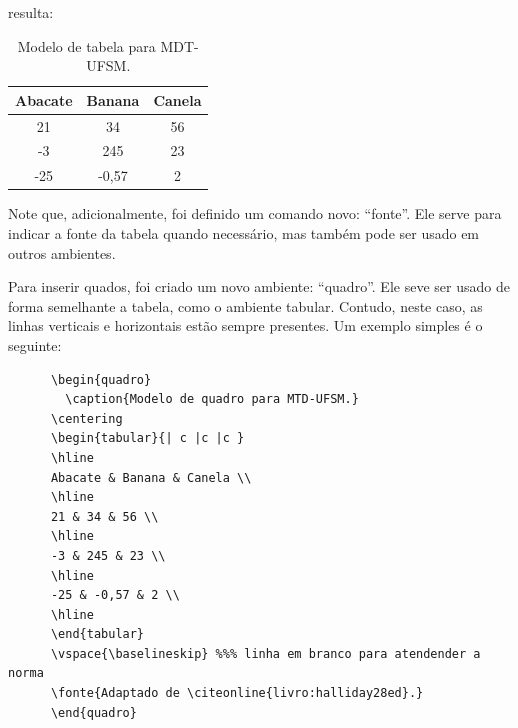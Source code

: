 \documentclass[oneside,openright,12pt]{ufsm_2015} %
\begin{document}
         \noindent resulta:
         
         \begin{table}[ht]
         \centering
         \caption{Modelo de tabela para MDT-UFSM.}
         \begin{tabular}{ c c c }
         \hline
         Abacate & Banana & Canela \\
         \hline
         21 & 34 & 56 \\
         -3 & 245 & 23 \\
         -25 & -0,57 & 2 \\
         \hline
         \end{tabular}
         \vspace{\baselineskip} %
         \end{table}
         
         \par Note que, adicionalmente, foi definido um comando novo: ``fonte''. Ele serve para indicar a fonte da tabela quando necessário, mas também pode ser usado em outros ambientes.
         
         \par Para inserir quados, foi criado um novo ambiente: ``quadro''. Ele seve ser usado de forma semelhante a tabela, como o ambiente tabular. Contudo, neste caso, as linhas verticais e horizontais estão sempre presentes. Um exemplo simples é o seguinte: 
         
         
         \begin{verbatim}
      \begin{quadro}
        \caption{Modelo de quadro para MTD-UFSM.}
      \centering
      \begin{tabular}{| c |c |c }
      \hline
      Abacate & Banana & Canela \\
      \hline
      21 & 34 & 56 \\
      \hline
      -3 & 245 & 23 \\
      \hline
      -25 & -0,57 & 2 \\
      \hline
      \end{tabular}
      \vspace{\baselineskip} %%% linha em branco para atendender a norma
      \fonte{Adaptado de \citeonline{livro:halliday28ed}.}
      \end{quadro}
         \end{verbatim}
         
\end{document}

